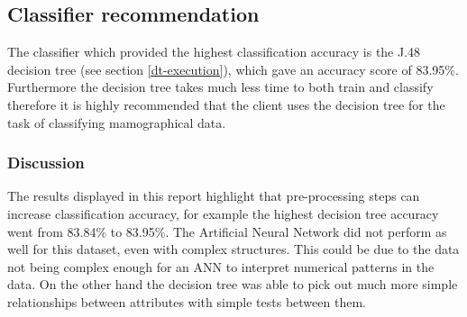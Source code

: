 \documentclass[12pt]{article}
\begin{document}
  \subsection{Classifier recommendation}
    The classifier which provided the highest classification accuracy is the J.48 decision tree (see section \ref{dt-execution}), which gave an accuracy score of 83.95\%. Furthermore the decision tree takes much less time to both train and classify therefore it is highly recommended that the client uses the decision tree for the task of classifying mamographical data.

  \subsubsection{Discussion}
    The results displayed in this report highlight that pre-processing steps can increase classification accuracy, for example the highest decision tree accuracy went from 83.84\% to 83.95\%. The Artificial Neural Network did not perform as well for this dataset, even with complex structures. This could be due to the data not being complex enough for an ANN to interpret numerical patterns in the data. On the other hand the decision tree was able to pick out much more simple relationships between attributes with simple tests between them.

\newpage



\end{document}
